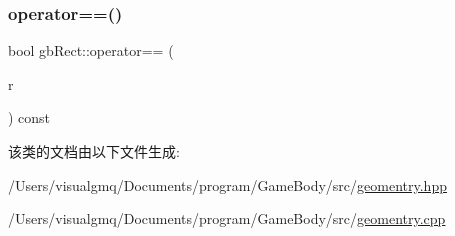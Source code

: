 \mbox{\label{classgb_rect_ab64eca7f0aa12098783fa406e61ded56}} 
\subsubsection{\texorpdfstring{operator==()}{operator==()}}
{\footnotesize\ttfamily bool gb\+Rect\+::operator== (\begin{DoxyParamCaption}\item[{\mbox{\hyperlink{classgb_rect}{gb\+Rect}}}]{r }\end{DoxyParamCaption}) const}



该类的文档由以下文件生成\+:\begin{DoxyCompactItemize}
\item 
/\+Users/visualgmq/\+Documents/program/\+Game\+Body/src/\mbox{\hyperlink{geomentry_8hpp}{geomentry.\+hpp}}\item 
/\+Users/visualgmq/\+Documents/program/\+Game\+Body/src/\mbox{\hyperlink{geomentry_8cpp}{geomentry.\+cpp}}\end{DoxyCompactItemize}
